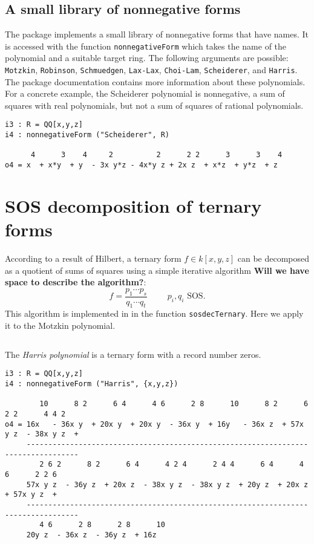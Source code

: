 \documentclass[11pt]{amsart}
\theoremstyle{plain}%
\theoremstyle{definition}
\theoremstyle{remark}
\begin{document}
\subsection{A small library of nonnegative forms}
The package implements a small library of nonnegative forms that have
names.  It is accessed with the function \verb|nonnegativeForm| which
takes the name of the polynomial and a suitable target ring.  The
following arguments are possible: \verb|Motzkin|, \verb|Robinson|,
\verb|Schmuedgen|, \verb|Lax-Lax|, \verb|Choi-Lam|, \verb|Scheiderer|,
and \verb|Harris|.  The package documentation contains more
information about these polynomials.  For a concrete example, the
Scheiderer polynomial is nonnegative, a sum of squares with real
polynomials, but not a sum of squares of rational polynomials.
\begin{verbatim}
i3 : R = QQ[x,y,z]
i4 : nonnegativeForm ("Scheiderer", R)

      4      3    4     2          2      2 2      3      3    4
o4 = x  + x*y  + y  - 3x y*z - 4x*y z + 2x z  + x*z  + y*z  + z

\end{verbatim}


\section{SOS decomposition of ternary forms}

According to a result of Hilbert, a ternary form $f\in k[x,y,z]$ can
be decomposed as a quotient of sums of squares using a simple
iterative algorithm \textbf{Will we have space to describe the
  algorithm?}:
\[
  f = \frac{p_{1}\cdots p_{s}}{q_{1}\cdots q_{t}} \qquad \text {
    $p_{i},q_{i}$ SOS}.
\]
This algorithm is implemented in in the function \verb|sosdecTernary|.
Here we apply it to the Motzkin polynomial.
\begin{verbatim}

\end{verbatim}

The \emph{Harris polynomial} is a ternary form with a record number
zeros. 
\begin{verbatim}
i3 : R = QQ[x,y,z]
i4 : nonnegativeForm ("Harris", {x,y,z})

        10      8 2      6 4      4 6      2 8      10      8 2      6 2 2      4 4 2
o4 = 16x   - 36x y  + 20x y  + 20x y  - 36x y  + 16y   - 36x z  + 57x y z  - 38x y z  +
     ----------------------------------------------------------------------------------
        2 6 2      8 2      6 4      4 2 4      2 4 4      6 4      4 6      2 2 6
     57x y z  - 36y z  + 20x z  - 38x y z  - 38x y z  + 20y z  + 20x z  + 57x y z  +
     ----------------------------------------------------------------------------------
        4 6      2 8      2 8      10
     20y z  - 36x z  - 36y z  + 16z
\end{verbatim}
\end{document}
